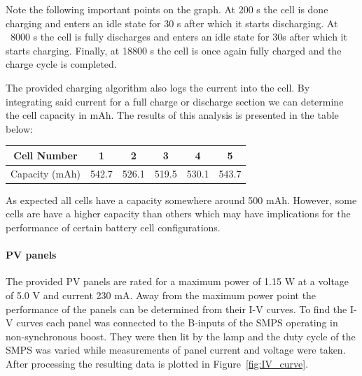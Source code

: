 \documentclass[a4paper]{article}
\begin{document}
Note the following important points on the graph. At 200 s the cell is done charging and
enters an idle state for 30 s after which it starts discharging. At ~8000 s the cell is fully
discharges and enters an idle state for 30s after which it starts charging. Finally, at 18800 s the cell is once 
again fully charged and the charge cycle is completed.

The provided charging algorithm also logs the current into the cell.
By integrating said current for a full charge or discharge section
we can determine the cell capacity in mAh. The results of this analysis is 
presented in the table below:

\begin{center}
    \begin{tabular}{||c| c c c c c||} 
    \hline
    Cell Number& 1 & 2 & 3 & 4 & 5 \\ [0.5ex] 
    \hline
    Capacity (mAh) & 542.7	& 526.1	& 519.5	& 530.1	& 543.7\\ [1ex] 
    \hline
    \end{tabular}
    \end{center}


As expected all cells have a capacity somewhere around 500 mAh. However, some cells
are have a higher capacity than others which may have implications for the performance
of certain battery cell configurations.

\paragraph*{PV panels}
The provided PV panels are rated for a maximum power of 1.15 W at a voltage 
of 5.0 V and current 230 mA. Away from the maximum power point the performance of 
the panels can be determined from their I-V curves. To find the I-V curves each 
panel was connected to the B-inputs of the SMPS operating in non-synchronous boost.
They were then lit by the lamp and the duty cycle of the SMPS was varied while measurements 
of panel current and voltage were taken. After processing the resulting data
is plotted in Figure~\ref{fig:IV_curve}.
\end{document}
